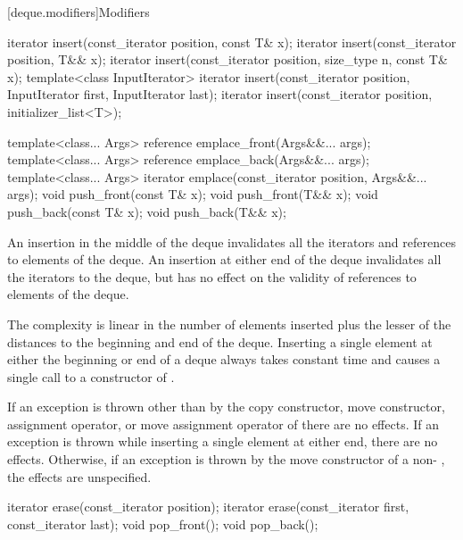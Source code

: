 [deque.modifiers]{Modifiers}

%
%
%
%
\begin{itemdecl}
iterator insert(const_iterator position, const T& x);
iterator insert(const_iterator position, T&& x);
iterator insert(const_iterator position, size_type n, const T& x);
template<class InputIterator>
  iterator insert(const_iterator position,
                  InputIterator first, InputIterator last);
iterator insert(const_iterator position, initializer_list<T>);

template<class... Args> reference emplace_front(Args&&... args);
template<class... Args> reference emplace_back(Args&&... args);
template<class... Args> iterator emplace(const_iterator position, Args&&... args);
void push_front(const T& x);
void push_front(T&& x);
void push_back(const T& x);
void push_back(T&& x);
\end{itemdecl}

\begin{itemdescr}
\pnum
\effects
An insertion in the middle of the deque invalidates all the iterators and
references to elements of the deque.
An insertion at either end of the
deque invalidates all the iterators to the deque, but has no effect on
the validity of references to elements of the deque.

\pnum
\complexity
The complexity is linear in the number of elements inserted plus the lesser
of the distances to the beginning and end of the deque.
Inserting a single element at either the beginning or end of a deque always takes constant time
and causes a single call to a constructor of
.

\pnum
\remarks
If an exception is thrown other than by the
copy constructor, move constructor,
assignment operator, or move assignment operator of
there are no effects.
If an exception is thrown while inserting a single element at either end,
there are no effects.
Otherwise, if an exception is thrown by the move constructor of a
non-
, the effects are unspecified.
\end{itemdescr}

%
\begin{itemdecl}
iterator erase(const_iterator position);
iterator erase(const_iterator first, const_iterator last);
void pop_front();
void pop_back();
\end{itemdecl}

